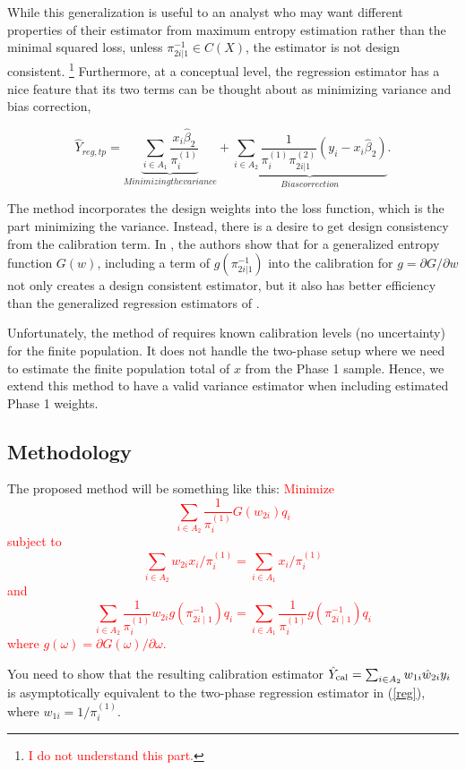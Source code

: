 \documentclass[12pt]{article}
\begin{document}
While this generalization is useful to an analyst who may want different
properties of their estimator from maximum entropy estimation rather than the
minimal squared loss, unless $\pi_{2i|1}^{-1} \in C(X)$, the estimator is not
design consistent. \footnote{ \textcolor{red}{I do not understand this part.} } 
Furthermore, at a conceptual level, the regression estimator
has a nice feature that its two terms can be thought about as minimizing
variance and bias correction,

$$ \hat Y_{reg, tp} 
= \underbrace{\sum_{i \in A_1} \frac{x_i \hat \beta_2}{\pi_i^{(1)}}}_{Minimizing
the variance} + \underbrace{\sum_{i \in A_2}
\frac{1}{\pi_i^{(1)}\pi_{2i|1}^{(2)}} (y_i - x_i \hat \beta_2)}_{Bias
correction}.$$

The \cite{deville1992calibration} method incorporates the design weights into
the loss function, which is the part minimizing the variance. Instead, there is
a desire to get design consistency from the calibration term. In 
\cite{kwon2024debiased}, the authors show that for a generalized entropy
function $G(w)$, including a term of $g(\pi_{2i|1}^{-1})$ into the calibration
for $g = \partial G / \partial w$ not only creates a design consistent
estimator, but it also has better efficiency than the generalized regression
estimators of \cite{deville1992calibration}.

Unfortunately, the method of \cite{kwon2024debiased} requires known calibration
levels (no uncertainty) for the finite population. It does not handle the
two-phase setup where we need to estimate the finite population total of $x$
from the Phase 1 sample. Hence, we extend this method to have a valid variance 
estimator when including estimated Phase 1 weights.

\subsection{Methodology}

The proposed method will be something like this: 
\textcolor{red}{Minimize 
$$
\sum_{i \in A_2} \frac{1}{\pi_i^{(1)}}  G( w_{2i} )  q_i 
$$
subject to 
$$
\sum_{i \in A_2} w_{2i}  x_i / \pi_i^{(1)} = \sum_{i \in A_1} x_i /
\pi_i^{(1)}$$
and 
$$
\sum_{i \in A_2}  \frac{1}{\pi_i^{(1)}} w_{2i} g( \pi_{2i \mid 1}^{-1} ) q_i  = \sum_{i \in A_1}  \frac{1}{\pi_i^{(1)}}  g( \pi_{2i \mid 1}^{-1} ) q_i $$
where $g(\omega) = \partial G( \omega)/ \partial \omega$. 
}

You need to show that the resulting calibration estimator $\hat{Y}_{\rm cal}= \sum_{i \in A_2} w_{1i} \hat{w}_{2i} y_i$ is asymptotically equivalent to the two-phase regression estimator in (\ref{reg}), where $w_{1i} = 1/ \pi_i^{(1)}$. 
\end{document}
